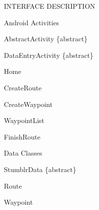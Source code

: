 \documentclass{article}
\begin{document}
\clearpage
\begin{section}{INTERFACE DESCRIPTION}
	\begin{subsection}{Android Activities}
		\begin{subsubsection}{AbstractActivity \{abstract\}}
			
		\end{subsubsection}
	
		\clearpage
		\begin{subsubsection}{DataEntryActivity \{abstract\}}
			
		\end{subsubsection}

		\begin{subsubsection}{Home}
			
		\end{subsubsection}

		\clearpage
		\begin{subsubsection}{CreateRoute}
			
		\end{subsubsection}

		\clearpage
		\begin{subsubsection}{CreateWaypoint}
			
		\end{subsubsection}

		\clearpage
		\begin{subsubsection}{WaypointList}
			
		\end{subsubsection}

		\clearpage
		\begin{subsubsection}{FinishRoute}
			
		\end{subsubsection}
	\end{subsection}

	\clearpage
	\begin{subsection}{Data Classes}
		\begin{subsubsection}{StumblrData \{abstract\}}
			
		\end{subsubsection}
		
		\clearpage
		\begin{subsubsection}{Route}
			
		\end{subsubsection}
		
		\clearpage
		\begin{subsubsection}{Waypoint}
			
		\end{subsubsection}
	\end{subsection}
\end{section}
\end{document}

